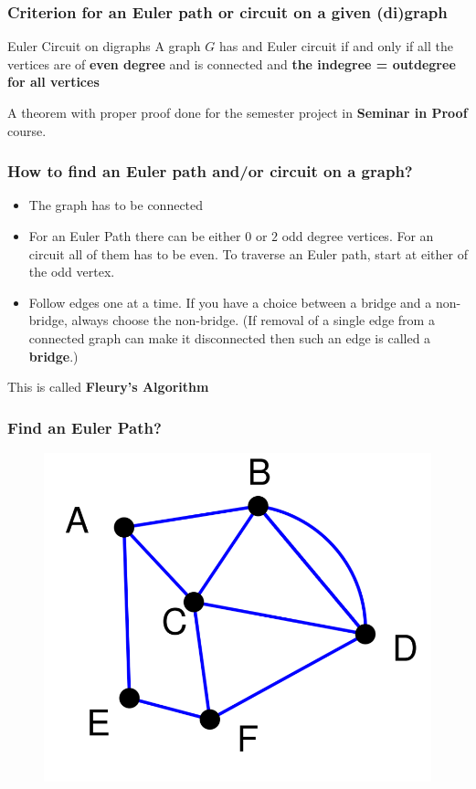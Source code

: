 \documentclass{beamer}
\begin{document}

\begin{frame}
\frametitle{Criterion for an Euler path or circuit on a given (di)graph}
\begin{block}{Euler Circuit on digraphs}
A graph $G$ has and Euler circuit if and only if all the vertices are of \textbf{even degree} and is connected and \textbf{the indegree = outdegree for all vertices}
\end{block}

\pause
 A theorem with proper proof done for the semester project in \textbf{Seminar in Proof} course.
\end{frame}


\begin{frame}
\frametitle{How to find an Euler path and/or circuit on a graph?}
\begin{itemize}
\item The graph has to be connected
\pause
\item For an Euler Path there can be either $0$ or $2$ odd degree vertices. For an circuit all of them has to be even. To traverse an Euler path, start at either of the odd vertex.
\pause
\item Follow edges one at a time. If you have a choice between a bridge and a non-bridge, always choose the non-bridge. (If removal of a single edge from a connected graph can make it disconnected then such an edge is called a \textbf{bridge}.)
\end{itemize}
\pause
This is called \textbf{Fleury's Algorithm}
\end{frame}



\begin{frame}
\frametitle{Find an Euler Path?}
\begin{figure}[h]
\includegraphics[scale = 0.4]{path2.png}
\end{figure}
\end{frame}
\end{document}
